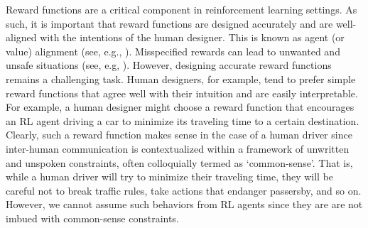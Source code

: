 \documentclass{article}
\begin{document}
Reward functions are a critical component in reinforcement learning settings. As such, it is important that reward functions are designed accurately and are well-aligned with the intentions of the human designer. This is known as agent (or value) alignment (see, e.g., \citet{leike2018scalable, leike2017gridworlds, amodei2016concrete}). Misspecified rewards can lead to unwanted and unsafe situations (see, e.g, \citet{amodei2016faulty}). However, designing accurate reward functions remains a challenging task. Human designers, for example, tend to prefer simple reward functions that agree well with their intuition and are easily interpretable. For example, a human designer might choose a reward function that encourages an RL agent driving a car to minimize its traveling time to a certain destination. Clearly, such a reward function makes sense in the case of a human driver since inter-human communication is contextualized within a framework of unwritten and unspoken constraints, often colloquially termed as `common-sense'. That is, while a human driver will try to minimize their traveling time, they will be careful not to break traffic rules, take actions that endanger passersby, and so on. However, we cannot assume such behaviors from RL agents since they are are not imbued with common-sense constraints.
\end{document}
